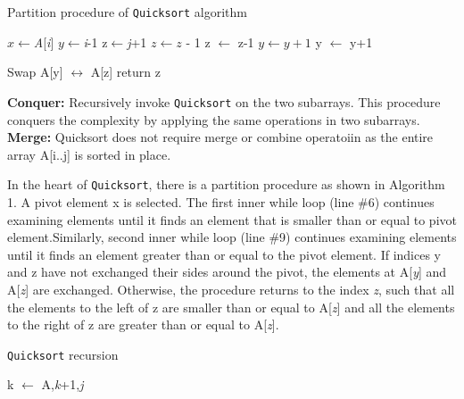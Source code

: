 \documentclass[a4paper,10pt,twocolumn]{article}
\begin{document}
\begin{algorithm}[t]
  \caption{Partition procedure of {\tt Quicksort} algorithm}
  \label{algo:ins_sort1}
  \begin{algorithmic}[1]
     \newline
     \newline
     
      \State $x \leftarrow${\it A}[{\it i}]
      \State $y \leftarrow${\it i}-1
      \State z$ \leftarrow${\it j}+1
          \State $z \leftarrow z$ - 1 
            \State z $\leftarrow$ z-1 
         \EndWhile
      \State $y \leftarrow y + 1$
                   \State y $\leftarrow$ y+1 
      \EndWhile
      
         \State Swap A[y] $\leftrightarrow$ A[z]
     \Else
         \State return z
     \EndIf  
      \EndWhile
     \EndProcedure 
  \end{algorithmic}
\end{algorithm}
\noindent\textbf{Conquer:} Recursively invoke {\tt Quicksort} on the two subarrays. This procedure conquers the complexity by applying the same operations in two subarrays.\\
\textbf{Merge:} Quicksort does not require merge or combine operatoiin as the entire array A[{i..j}] is sorted in place.

In the heart of {\tt Quicksort}, there is a partition procedure as shown in Algorithm 1. A pivot element x is selected. The first inner while loop (line \#6) continues examining elements until it finds an element that is smaller than or equal to pivot element.Similarly, second inner while loop (line \#9) continues examining elements until it finds an element greater than or equal to the pivot element. If indices y and z have not exchanged their sides around the pivot, the elements at A[{\it y}] and A[{\it z}] are exchanged. Otherwise, the procedure returns to the index {\it z}, such that all the elements to the left of z are smaller than or equal to A[{\it z}] and all the elements to the right of z are greater than or equal to A[{\it z}].  
\begin{algorithm}[t]
  \caption{{\tt Quicksort} recursion}
  \label{algo:ins_sort1}
  \begin{algorithmic}[1]
     \newline
         \State k $\leftarrow$ 
         \State {}
         \State {} {A,{\it k}+1,{\it j}}
     \EndIf  
     \EndProcedure 
  \end{algorithmic}
\end{algorithm}
\end{document}
